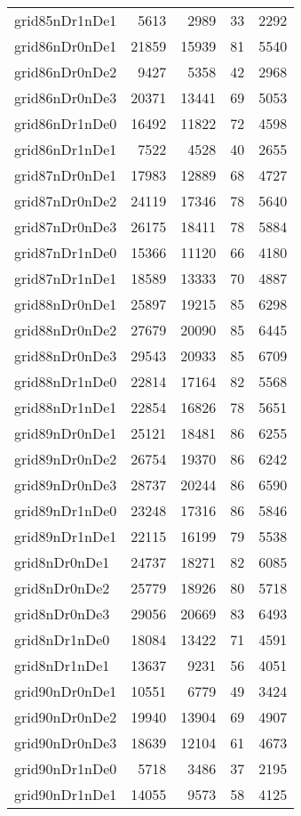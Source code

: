 \begin{longtable}{lrrrr}
grid85nDr1nDe1 & 5613 & 2989 & 33 & 2292 \\
grid86nDr0nDe1 & 21859 & 15939 & 81 & 5540 \\
grid86nDr0nDe2 & 9427 & 5358 & 42 & 2968 \\
grid86nDr0nDe3 & 20371 & 13441 & 69 & 5053 \\
grid86nDr1nDe0 & 16492 & 11822 & 72 & 4598 \\
grid86nDr1nDe1 & 7522 & 4528 & 40 & 2655 \\
grid87nDr0nDe1 & 17983 & 12889 & 68 & 4727 \\
grid87nDr0nDe2 & 24119 & 17346 & 78 & 5640 \\
grid87nDr0nDe3 & 26175 & 18411 & 78 & 5884 \\
grid87nDr1nDe0 & 15366 & 11120 & 66 & 4180 \\
grid87nDr1nDe1 & 18589 & 13333 & 70 & 4887 \\
grid88nDr0nDe1 & 25897 & 19215 & 85 & 6298 \\
grid88nDr0nDe2 & 27679 & 20090 & 85 & 6445 \\
grid88nDr0nDe3 & 29543 & 20933 & 85 & 6709 \\
grid88nDr1nDe0 & 22814 & 17164 & 82 & 5568 \\
grid88nDr1nDe1 & 22854 & 16826 & 78 & 5651 \\
grid89nDr0nDe1 & 25121 & 18481 & 86 & 6255 \\
grid89nDr0nDe2 & 26754 & 19370 & 86 & 6242 \\
grid89nDr0nDe3 & 28737 & 20244 & 86 & 6590 \\
grid89nDr1nDe0 & 23248 & 17316 & 86 & 5846 \\
grid89nDr1nDe1 & 22115 & 16199 & 79 & 5538 \\
grid8nDr0nDe1 & 24737 & 18271 & 82 & 6085 \\
grid8nDr0nDe2 & 25779 & 18926 & 80 & 5718 \\
grid8nDr0nDe3 & 29056 & 20669 & 83 & 6493 \\
grid8nDr1nDe0 & 18084 & 13422 & 71 & 4591 \\
grid8nDr1nDe1 & 13637 & 9231 & 56 & 4051 \\
grid90nDr0nDe1 & 10551 & 6779 & 49 & 3424 \\
grid90nDr0nDe2 & 19940 & 13904 & 69 & 4907 \\
grid90nDr0nDe3 & 18639 & 12104 & 61 & 4673 \\
grid90nDr1nDe0 & 5718 & 3486 & 37 & 2195 \\
grid90nDr1nDe1 & 14055 & 9573 & 58 & 4125 \\

\end{longtable}
